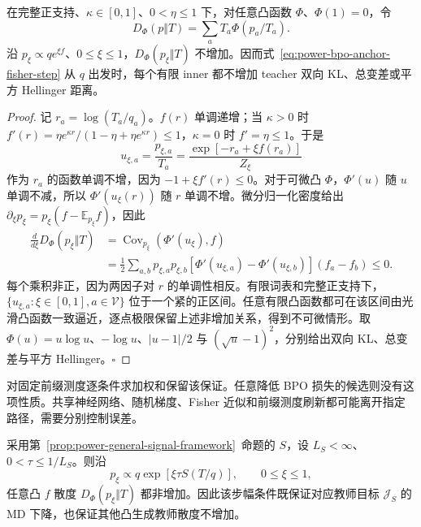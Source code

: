 \documentclass[lang=cn,scheme=chinese,openany]{../book/elegantbook}
\newcommand{\E}{\mathbb E}
\begin{document}
\begin{theorem}
\label{thm:power-bpo-inner-all-f}
在完整正支持、$\kappa\in[0,1]$、$0<\eta\le1$ 下，对任意凸函数 $\Phi$、$\Phi(1)=0$，令
\begin{equation}
 D_\Phi(p\Vert T)=\sum_aT_a\Phi(p_a/T_a).
\end{equation}
沿 $p_\xi\propto qe^{\xi f}$、$0\le\xi\le1$，$D_\Phi(p_\xi\Vert T)$ 不增加。因而式~\eqref{eq:power-bpo-anchor-fisher-step} 从 $q$ 出发时，每个有限 inner 都不增加 teacher 双向 KL、总变差或平方 Hellinger 距离。
\end{theorem}

\begin{proof}
记 $r_a=\log(T_a/q_a)$。$f(r)$ 单调递增；当 $\kappa>0$ 时 $f'(r)=\eta e^{\kappa r}/(1-\eta+\eta e^{\kappa r})\le1$，$\kappa=0$ 时 $f'=\eta\le1$。于是
\begin{equation}
 u_{\xi,a}=\frac{p_{\xi,a}}{T_a}
 =\frac{\exp[-r_a+\xi f(r_a)]}{Z_\xi}
\end{equation}
作为 $r_a$ 的函数单调不增，因为 $-1+\xi f'(r)\le0$。对于可微凸 $\Phi$，$\Phi'(u)$ 随 $u$ 单调不减，所以 $\Phi'(u_\xi(r))$ 随 $r$ 单调不增。微分归一化密度给出 $\partial_\xi p_\xi=p_\xi(f-\E_{p_\xi}f)$，因此
\begin{align}
 \frac{d}{d\xi}D_\Phi(p_\xi\Vert T)
 &=\operatorname{Cov}_{p_\xi}(\Phi'(u_\xi),f)\\
 &=\frac12\sum_{a,b}p_{\xi,a}p_{\xi,b}
   [\Phi'(u_{\xi,a})-\Phi'(u_{\xi,b})](f_a-f_b)
 \le0.
\end{align}
每个乘积非正，因为两因子对 $r$ 的单调性相反。有限词表和完整正支持下，$\{u_{\xi,a}:\xi\in[0,1],a\in\mathcal V\}$ 位于一个紧的正区间。任意有限凸函数都可在该区间由光滑凸函数一致逼近，逐点极限保留上述非增加关系，得到不可微情形。取 $\Phi(u)=u\log u$、$-\log u$、$|u-1|/2$ 与 $(\sqrt u-1)^2$，分别给出双向 KL、总变差与平方 Hellinger。\hfill$\square$
\end{proof}

对固定前缀测度逐条件求加权和保留该保证。任意降低 BPO 损失的候选则没有这项性质。共享神经网络、随机梯度、Fisher 近似和前缀测度刷新都可能离开指定路径，需要分别控制误差。

\begin{corollary}
\label{cor:power-general-signal-all-f}
采用第~\ref{prop:power-general-signal-framework}~命题的 $S$，设 $L_S<\infty$、$0<\tau\le1/L_S$。则沿
\begin{equation}
 p_\xi\propto q\exp[\xi\tau S(T/q)],\qquad0\le\xi\le1,
\end{equation}
任意凸 $f$ 散度 $D_\Phi(p_\xi\Vert T)$ 都非增加。因此该步幅条件既保证对应教师目标 $\mathcal J_S$ 的 MD 下降，也保证其他凸生成教师散度不增加。
\end{corollary}
\end{document}
